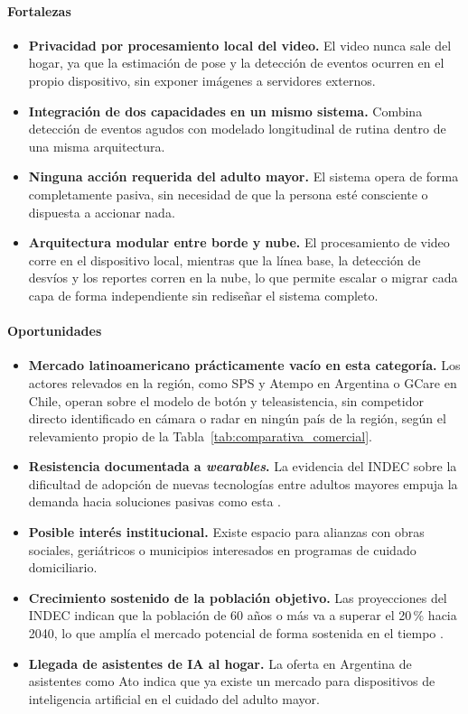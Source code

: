 \paragraph{Fortalezas}
\begin{itemize}
    \item \textbf{Privacidad por procesamiento local del video.} El video nunca sale del hogar, ya que la estimación de pose y la detección de eventos ocurren en el propio dispositivo, sin exponer imágenes a servidores externos.
    \item \textbf{Integración de dos capacidades en un mismo sistema.} Combina detección de eventos agudos con modelado longitudinal de rutina dentro de una misma arquitectura.
    \item \textbf{Ninguna acción requerida del adulto mayor.} El sistema opera de forma completamente pasiva, sin necesidad de que la persona esté consciente o dispuesta a accionar nada.
    \item \textbf{Arquitectura modular entre borde y nube.} El procesamiento de video corre en el dispositivo local, mientras que la línea base, la detección de desvíos y los reportes corren en la nube, lo que permite escalar o migrar cada capa de forma independiente sin rediseñar el sistema completo.
\end{itemize}

\paragraph{Oportunidades}
\begin{itemize}
    \item \textbf{Mercado latinoamericano prácticamente vacío en esta categoría.} Los actores relevados en la región, como SPS y Atempo en Argentina o GCare en Chile, operan sobre el modelo de botón y teleasistencia, sin competidor directo identificado en cámara o radar en ningún país de la región, según el relevamiento propio de la Tabla~\ref{tab:comparativa_comercial}.
    \item \textbf{Resistencia documentada a \textit{wearables}.} La evidencia del INDEC sobre la dificultad de adopción de nuevas tecnologías entre adultos mayores empuja la demanda hacia soluciones pasivas como esta \parencite{INDEC2020}.
    \item \textbf{Posible interés institucional.} Existe espacio para alianzas con obras sociales, geriátricos o municipios interesados en programas de cuidado domiciliario.
    \item \textbf{Crecimiento sostenido de la población objetivo.} Las proyecciones del INDEC indican que la población de 60 años o más va a superar el 20\,\% hacia 2040, lo que amplía el mercado potencial de forma sostenida en el tiempo \parencite{INDEC2024}.
    \item \textbf{Llegada de asistentes de IA al hogar.} La oferta en Argentina de asistentes como Ato \parencite{Ato} indica que ya existe un mercado para dispositivos de inteligencia artificial en el cuidado del adulto mayor.
\end{itemize}

